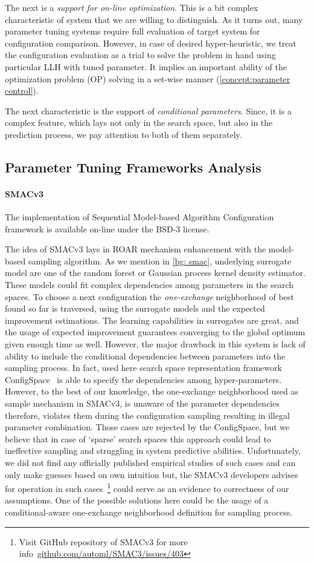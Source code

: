 The next is a \emph{support for on-line optimization}. This is a bit complex characteristic of system that we are willing to distinguish. As it turns out, many parameter tuning systems require full evaluation of target system for configuration comparison. However, in case of desired hyper-heuristic, we treat the configuration evaluation as a trial to solve the problem in hand using particular LLH with tuned parameter. It implies an important ability of the optimization problem (OP) solving in a set-wise manner (\cref{concept:parameter control}).

The next characteristic is the support of \emph{conditional parameters}. Since, it is a complex feature, which lays not only in the search space, but also in the prediction process, we pay attention to both of them separately.

\subsection{Parameter Tuning Frameworks Analysis}\label{impl: Parameter Tuning Frameworks Analysis}
\paragraph{SMACv3}
The implementation of Sequential Model-based Algorithm Configuration framework is available on-line under the BSD-3 license.

The idea of SMACv3 lays in ROAR mechanism enhancement with the model-based sampling algorithm.
As we mention in \cref{bg: smac}, underlying surrogate model are one of the random forest or Gaussian process kernel density estimator. These models could fit complex dependencies among parameters in the search spaces. To choose a next configuration the \emph{one-exchange} neighborhood of best found so far is traversed, using the surrogate models and the expected improvement estimations.
The learning capabilities in surrogates are great, and the usage of expected improvement guarantees converging to the global optimum given enough time as well. However, the major drawback in this system is lack of ability to include the conditional dependencies between parameters into the sampling process. In fact, used here search space representation framework ConfigSpace~\cite{configspace} is able to specify the dependencies among hyper-parameters.
However, to the best of our knowledge, the one-exchange neighborhood used as sample mechanism in SMACv3, is unaware of the parameter dependencies therefore, violates them during the configuration sampling resulting in illegal parameter combination. Those cases are rejected by the ConfigSpace, but we believe that in case of `sparse' search spaces this approach could lead to ineffective sampling and struggling in system predictive abilities. Unfortunately, we did not find any officially published empirical studies of such cases and can only make guesses based on own intuition but, the SMACv3 developers advises for operation in such cases~\footnote{Visit GitHub repository of SMACv3 for more info~\url{github.com/automl/SMAC3/issues/403}} could serve as an evidence to correctness of our assumptions. One of the possible solutions here could be the usage of a conditional-aware one-exchange neighborhood definition for sampling process.

